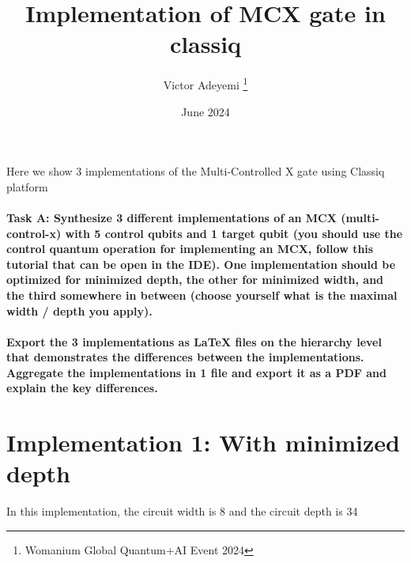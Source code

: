 \documentclass[12pt, letterpaper]{article}
\title{Implementation of MCX gate in classiq}
\author{Victor Adeyemi \thanks{Womanium Global Quantum+AI Event 2024}}
\date{June 2024}
\begin{document}
\maketitle
Here we show 3 implementations of the Multi-Controlled X gate using Classiq platform
\paragraph{
Task A: Synthesize 3 different implementations of an MCX (multi-control-x) with 5 control qubits and 1 target qubit (you should use the control quantum operation for implementing an MCX, follow this tutorial that can be open in the IDE). One implementation should be optimized for minimized depth, the other for minimized width, and the third somewhere in between (choose yourself what is the maximal width / depth you apply).}

\paragraph{
Export the 3 implementations as LaTeX files on the hierarchy level that demonstrates the differences between the implementations. Aggregate the implementations in 1 file and export it as a PDF and explain the key differences.}

\newpage{}
\section{Implementation 1: With minimized depth}

In this implementation, the circuit width is 8 and the circuit depth is 34

\end{document}
